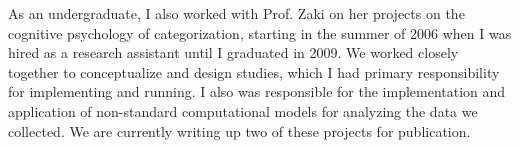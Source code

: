 \documentclass[12pt]{article}
\begin{document}



As an undergraduate, I also worked with Prof. Zaki on her projects on the cognitive psychology of categorization, starting in the summer of 2006 when I was hired as a research assistant until I graduated in 2009.  We worked closely together to conceptualize and design studies, which I had primary responsibility for implementing and running.  I also was responsible for the implementation and application of non-standard computational models for analyzing the data we collected.  We are currently writing up two of these projects for publication.
\end{document}
